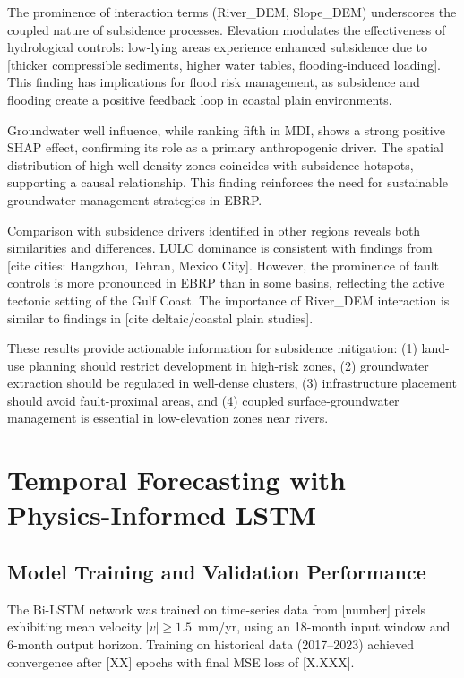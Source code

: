 The prominence of interaction terms (River\_DEM, Slope\_DEM) underscores the coupled nature of subsidence processes. Elevation modulates the effectiveness of hydrological controls: low-lying areas experience enhanced subsidence due to [thicker compressible sediments, higher water tables, flooding-induced loading]. This finding has implications for flood risk management, as subsidence and flooding create a positive feedback loop in coastal plain environments.

Groundwater well influence, while ranking fifth in MDI, shows a strong positive SHAP effect, confirming its role as a primary anthropogenic driver. The spatial distribution of high-well-density zones coincides with subsidence hotspots, supporting a causal relationship. This finding reinforces the need for sustainable groundwater management strategies in EBRP.

Comparison with subsidence drivers identified in other regions reveals both similarities and differences. LULC dominance is consistent with findings from [cite cities: Hangzhou, Tehran, Mexico City]. However, the prominence of fault controls is more pronounced in EBRP than in some basins, reflecting the active tectonic setting of the Gulf Coast. The importance of River\_DEM interaction is similar to findings in [cite deltaic/coastal plain studies].

These results provide actionable information for subsidence mitigation: (1) land-use planning should restrict development in high-risk zones, (2) groundwater extraction should be regulated in well-dense clusters, (3) infrastructure placement should avoid fault-proximal areas, and (4) coupled surface-groundwater management is essential in low-elevation zones near rivers.


\section{Temporal Forecasting with Physics-Informed LSTM}

\subsection{Model Training and Validation Performance}

The Bi-LSTM network was trained on time-series data from [number] pixels exhibiting mean velocity $|v| \geq 1.5$~mm/yr, using an 18-month input window and 6-month output horizon. Training on historical data (2017--2023) achieved convergence after [XX] epochs with final MSE loss of [X.XXX].


